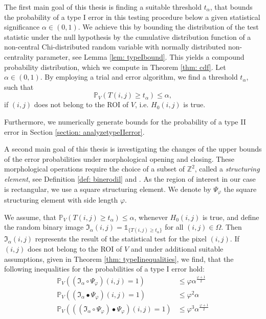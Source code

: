 \documentclass[a4paper,12pt]{article}
\theoremstyle{plain}
\theoremstyle{definition}
\numberwithin{equation}{section}
\begin{document}
The first main goal of this thesis is finding a suitable threshold $t_\alpha$, that bounds the probability of a type I error in this testing procedure below a given statistical significance $\alpha \in (0, 1)$. We achieve this by bounding the distribution of the test statistic under the null hypothesis by the cumulative distribution function of a non-central Chi-distributed random variable with normally distributed non-centrality parameter, see Lemma \ref{lem: typeIbound}. This yields a compound probability distribution, which we compute in Theorem \ref{thm: cdf}. Let $\alpha \in (0, 1)$. By employing a trial and error algorithm, we find a threshold $t_\alpha$, such that
\begin{equation*}
	\mathbb{P}_V\left( T(i, j) \geq t_\alpha \right) \leq \alpha,
\end{equation*}
if $(i, j)$ does not belong to the ROI of $V$, i.e. $H_0(i, j)$ is true.

Furthermore, we numerically generate bounds for the probability of a type II error in Section \ref{section: analyzetypeIIerror}.

A second main goal of this thesis is investigating the changes of the upper bounds of the error probabilities under morphological opening and closing. These morphological operations require the choice of a subset of $\mathbb{Z}^2$, called a \emph{structuring element}, see Definition \ref{def: binerodil} and \cite{imageprocessing}. As the region of interest in our case is rectangular, we use a square structuring element. We denote by $\Psi_\varphi$ the square structuring element with side length $\varphi$.

We assume, that $\mathbb{P}_V\left( T(i, j) \geq t_\alpha \right) \leq \alpha$, whenever $H_0(i, j)$ is true, and define the random binary image $\mathfrak{I}_\alpha(i, j) = \mathds{1}_{ \{ T(i, j) \geq t_\alpha \} }$ for all $(i, j) \in \Omega$. Then $\mathfrak{I}_\alpha(i, j)$ represents the result of the statistical test for the pixel $(i, j)$. If $(i, j)$ does not belong to the ROI of $V$ and under additional suitable assumptions, given in Theorem \ref{thm: typeIinequalities}, we find, that the following inequalities for the probabilities of a type I error hold:
\begin{align}
	\mathbb{P}_V\left( (\mathfrak{I}_\alpha \circ \Psi_\varphi)(i, j) = 1 \right) &\leq \varphi \alpha^{\frac{\varphi + 1}{2}} \\
	\mathbb{P}_V\left( (\mathfrak{I}_\alpha \bullet \Psi_\varphi)(i, j) = 1 \right) &\leq \varphi^2 \alpha \\
	\mathbb{P}_V\left( ((\mathfrak{I}_\alpha \circ \Psi_\varphi) \bullet \Psi_\varphi)(i, j) = 1 \right) &\leq \varphi^3 \alpha^{\frac{\varphi + 1}{2}}
\end{align}
\end{document}
